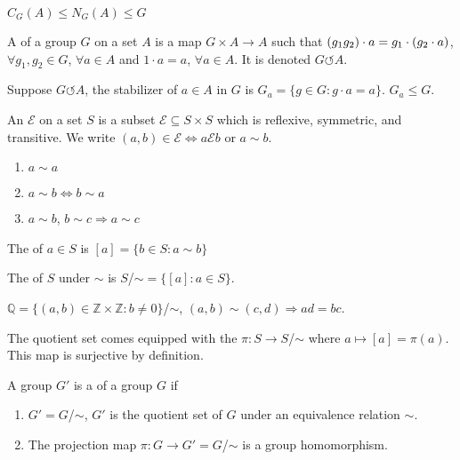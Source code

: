 \documentclass{mathnotes}
\begin{document}
\begin{prop}
  $C_G(A)\le N_G(A)\le G$
\end{prop}

\begin{defi}
  A  of a group $G$ on a set $A$ is a map $G\times
  A\rightarrow A$ such that $(g_1g_2)\cdot a=g_1\cdot\left( g_2\cdot a \right)$,
  $\forall g_1,g_2\in G$, $\forall a\in A$ and $1\cdot a=a$, $\forall a\in
  A$. It is denoted $G\circlearrowleft A$.
\end{defi}

\begin{defi}
  Suppose $G\circlearrowleft A$, the stabilizer of $a\in A$ in $G$ is
  $G_a=\{g\in G:g\cdot a=a\}$. $G_a\le G$.
\end{defi}

\begin{bdefi}
  An  $\mathcal{E}$ on a set $S$ is a subset
  $\mathcal{E}\subseteq S\times S$ which is reflexive, symmetric, and
  transitive. We write $(a,b)\in\mathcal{E}\Leftrightarrow
  a\mathrel\mathcal{E}b$ or $a\sim b$.
  \begin{enumerate}
    \item $a\sim a$
    \item $a\sim b\Leftrightarrow b\sim a$
    \item $a\sim b$, $b\sim c\Rightarrow a\sim c$
  \end{enumerate}
\end{bdefi}

\begin{defi}
  The  of $a\in S$ is $[a]=\{b\in S:a\sim b\}$
\end{defi}

\begin{defi}
  The  of $S$ under $\sim$ is $S$/$\sim=\{[a]:a\in S\}$.
\end{defi}

\begin{ex}
  $\mathbb{Q}=\{(a,b)\in\mathbb{Z}\times\mathbb{Z}:b\ne 0\}$/$\sim$,
  $(a,b)\sim(c,d)\Rightarrow ad=bc$.
\end{ex}

\begin{defi}
  The quotient set comes equipped with the 
  $\pi:S\rightarrow S$/$\sim$ where $a\mapsto[a]=\pi(a)$. This map is
  surjective by definition.
\end{defi}

\begin{bdefi}
  A group $G'$ is a  of a group $G$ if
  \begin{enumerate}
    \item $G'=G$/$\sim$, $G'$ is the quotient set of $G$ under an equivalence
      relation $\sim$.
    \item The projection map $\pi:G\to G'=G$/$\sim$ is a group homomorphism.
  \end{enumerate}
\end{bdefi}
\end{document}
